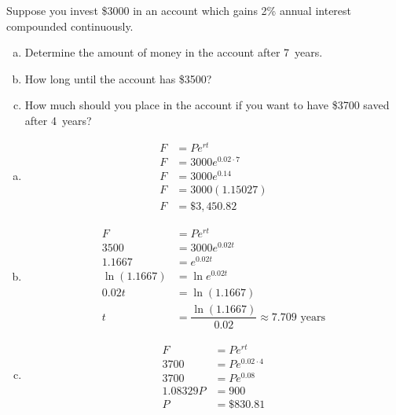 \documentclass[11pt,letterpaper]{article}
\begin{document}
 Suppose you invest \$3000 in an account which gains 2\% annual interest compounded continuously. 
        \begin{enumerate}[(a)]
        \item Determine the amount of money in the account after 7~years.
        \item How long until the account has \$3500?
        \item How much should you place in the account if you want to have \$3700 saved after 4~years?
        \end{enumerate} \pspace

\sol 
\begin{enumerate}[(a)]
\item 
	\[
	\begin{aligned}
	F&= Pe^{rt} \\
	F&= 3000 e^{0.02 \cdot 7} \\
	F&= 3000 e^{0.14} \\
	F&= 3000(1.15027) \\
	F&= \$3,450.82
	\end{aligned}
	\] \pspace

\item 
	\[
	\begin{aligned}
	F&= Pe^{rt} \\
	3500&= 3000 e^{0.02 t} \\
	1.1667&= e^{0.02t} \\
	\ln(1.1667)&= \ln e^{0.02t} \\
	0.02t&= \ln(1.1667) \\
	t&= \dfrac{\ln(1.1667)}{0.02} \approx 7.709 \text{ years}
	\end{aligned}
	\] \pspace

\item 
	\[
	\begin{aligned}
	F&= Pe^{rt} \\
	3700&= P e^{0.02 \cdot 4} \\
	3700&= P e^{0.08} \\
	1.08329P&= 900 \\
	P&= \$830.81
	\end{aligned}
	\]
\end{enumerate}


\end{document}
